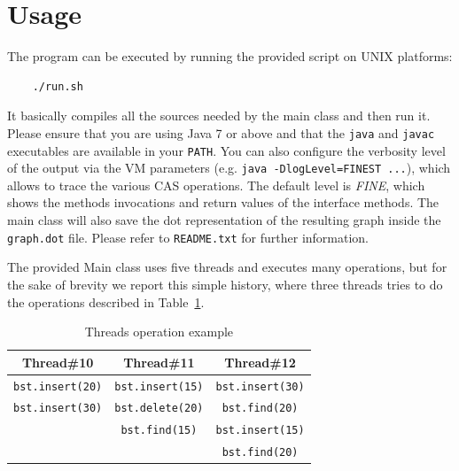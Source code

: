\documentclass[a4paper,draft,12pt]{article}
\begin{document}
\section{Usage} %
\label{sec:usage}
The program can be executed by running the provided script on UNIX platforms:
\begin{verbatim}
    ./run.sh
\end{verbatim}
It basically compiles all the sources needed by the main class and then run it.
Please ensure that you are using Java 7 or above and that the \texttt{java} and \texttt{javac} executables are available in your \texttt{PATH}.
You can also configure the verbosity level of the output via the VM parameters (e.g. \texttt{java -DlogLevel=FINEST ...}), which allows to trace the various \ac{CAS} operations.
The default level is \emph{FINE}, which shows the methods invocations and return values of the interface methods.
The main class will also save the dot representation of the resulting graph inside the \texttt{graph.dot} file.
Please refer to \texttt{README.txt} for further information.

The provided Main class uses five threads and executes many operations, but for the sake of brevity we report this simple history, where three threads tries to do the operations described in Table~\ref{table:thread_ops}.

\begin{table}
\centering
\begin{tabular}{c|c|c}
{\bf Thread\#10} & {\bf Thread\#11} & {\bf Thread\#12} \\
\hline
\texttt{bst.insert(20)}   & \texttt{bst.insert(15)}   & \texttt{bst.insert(30)}   \\
\texttt{bst.insert(30)}   & \texttt{bst.delete(20)}   & \texttt{bst.find(20)}     \\
                 & \texttt{bst.find(15)}     & \texttt{bst.insert(15)}   \\
                 &                  & \texttt{bst.find(20)}
\end{tabular}
\caption{Threads operation example}
\label{table:thread_ops}
\end{table}
\end{document}
